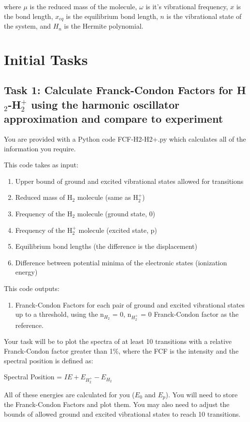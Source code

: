 \documentclass[12pt]{article}
\begin{document}
\noindent where $\mu$ is the reduced mass of the molecule, $\omega$ is it's vibrational frequency, $x$ is the bond length, $x_{eq}$ is the equilibrium bond length, $n$ is the vibrational state of the system, and $H_n$ is the Hermite polynomial.

\section{Initial Tasks}

\subsection{Task 1: Calculate Franck-Condon Factors for H$_2$-H$_2^+$ using the harmonic oscillator approximation and compare to experiment}
You are provided with a Python code FCF-H2-H2+.py which calculates all of the information you require.

\noindent This code takes as input:
\begin{enumerate}
    \item Upper bound of ground and excited vibrational states allowed for transitions
    \item Reduced mass of H$_2$ molecule (same as H$_2^+$)
    \item Frequency of the H$_2$ molecule  (ground state, 0)
    \item Frequency of the H$_2^+$ molecule (excited state, p)
    \item Equilibrium bond lengths (the difference is the displacement)
    \item Difference between potential minima of the electronic states (ionization energy)
\end{enumerate}

\noindent This code outputs:
\begin{enumerate}
    \item Franck-Condon Factors for each pair of ground and excited vibrational states up to a threshold, using the n$_{H_2}$ = 0, n$_{H_2^+}$ = 0 Franck-Condon factor as the reference.
\end{enumerate}

\noindent Your task will be to plot the spectra of at least 10 transitions with a relative Franck-Condon factor greater than 1\%, where the FCF is the intensity and the spectral position is defined as:

\noindent Spectral Position = $IE + E_{H_2^+} - E_{H_2}$

\noindent All of these energies are calculated for you ($E_0$ and $E_p$). You will need to store the Franck-Condon Factors and plot them. You may also need to adjust the bounds of allowed ground and excited vibrational states to reach 10 transitions. 
\end{document}
